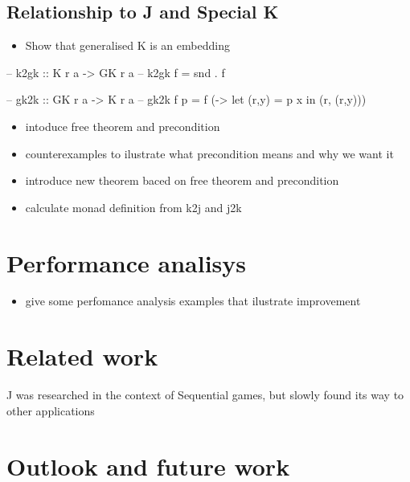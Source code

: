 \documentclass[runningheads]{llncs}
\providecommand{\tightlist}{%
  \setlength{\itemsep}{0pt}\setlength{\parskip}{0pt}}
\begin{document}
\subsection{Relationship to J and Special
K}\label{relationship-to-j-and-special-k}

\begin{itemize}
\tightlist
\item
  Show that generalised K is an embedding
\end{itemize}

\begin{code}
-- k2gk :: K r a -> GK r a
-- k2gk f = snd . f
\end{code}

\begin{code}
-- gk2k :: GK r a -> K r a
-- gk2k f p =  f (\x -> let (r,y) = p x in (r, (r,y)))
\end{code}

\begin{itemize}
\tightlist
\item
  intoduce free theorem and precondition
\item
  counterexamples to ilustrate what precondition means and why we want
  it
\item
  introduce new theorem baced on free theorem and precondition
\item
  calculate monad definition from k2j and j2k
\end{itemize}

\section{Performance analisys}\label{performance-analisys}

\begin{itemize}
\tightlist
\item
  give some perfomance analysis examples that ilustrate improvement
\end{itemize}

\section{Related work}\label{related-work}

J was researched in the context of Sequential games, but slowly found
its way to other applications

\section{Outlook and future work}\label{outlook-and-future-work}
\end{document}

